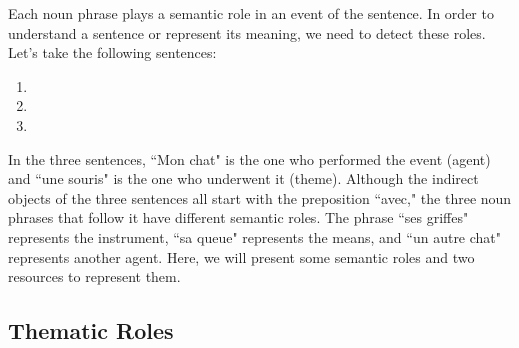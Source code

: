 \documentclass{KBook}
\begin{document}
Each noun phrase plays a semantic role in an event of the sentence.
In order to understand a sentence or represent its meaning, we need to detect these roles.
Let's take the following sentences:
\begin{enumerate}
	\item {} 
	\item {}
	\item {}
\end{enumerate}
In the three sentences, ``Mon chat" is the one who performed the event (agent) and ``une souris" is the one who underwent it (theme).
Although the indirect objects of the three sentences all start with the preposition ``avec," the three noun phrases that follow it have different semantic roles. 
The phrase ``ses griffes" represents the instrument, ``sa queue" represents the means, and ``un autre chat" represents another agent.
Here, we will present some semantic roles and two resources to represent them.

\subsection{Thematic Roles}
\end{document}
